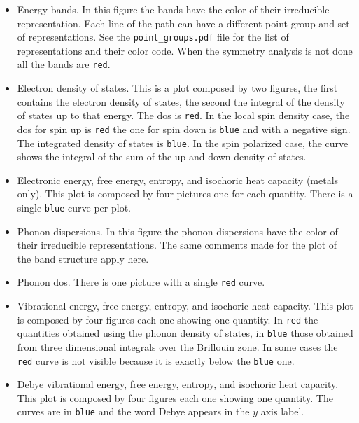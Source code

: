 \documentclass[12pt,a4paper]{article}
\begin{document}
\begin{itemize}
\item
Energy bands. In this figure the bands have the color of
their irreducible representation. Each line of the path can have a different
point group and set of representations. See the \texttt{point\_groups.pdf} file
for the list of representations and their color code. 
When the symmetry analysis is not done all the bands are \texttt{red}.
                              
\item
Electron density of states. This is a plot composed by two figures,
the first contains the electron density of states, the second the integral
of the density of states up to that energy. The dos is \texttt{red}.
In the local spin density case, the dos for spin up is \texttt{red} the
one for spin down is \texttt{blue} and with a negative sign.          
The integrated density of states is \texttt{blue}. In the spin polarized
case, the curve shows the integral of the sum of the up and down density 
of states.

\item
Electronic energy, free energy, entropy, and isochoric heat capacity 
(metals only). This plot is composed by four pictures one for each
quantity. There is a single \texttt{blue} curve per plot.      

\item
Phonon dispersions. In this figure the phonon dispersions have the color 
of their irreducible representations. The same comments made for the plot of 
the band structure apply here.                       

\item
Phonon dos. There is one picture with a single \texttt{red} curve.  
   
\item
Vibrational energy, free energy, entropy, and isochoric heat capacity. This plot
is composed by four figures each one showing one quantity. In \texttt{red} the 
quantities obtained using the phonon density of states, 
in \texttt{blue} those obtained from three dimensional integrals over 
the Brillouin zone. In some cases the \texttt{red} curve is not visible 
because it is exactly below the \texttt{blue} one.

\item
Debye vibrational energy, free energy, 
entropy, and isochoric heat capacity. This plot is composed by four 
figures each one showing one quantity. The curves are in \texttt{blue}
and the word Debye appears in the $y$ axis label.
                                            

\end{itemize}
\end{document}
